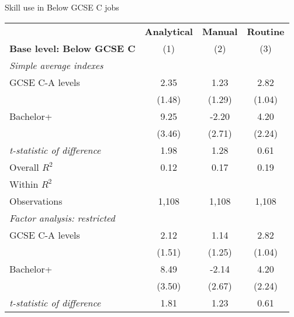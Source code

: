 \begin{center}
\begin{threeparttable}[!h]
\caption{Skill use in Below GCSE C jobs}
\label{tab:skillRegs}
\begin{tabular}{lccc}
\toprule
\toprule
&\multicolumn{1}{c}{\textbf{Analytical}}&\multicolumn{1}{c}{\textbf{Manual}}&\multicolumn{1}{c}{\textbf{Routine}} \\
\textbf{Base level: Below GCSE C}&\multicolumn{1}{c}{(1)}&\multicolumn{1}{c}{(2)}&\multicolumn{1}{c}{(3)} \\
\midrule
\textit{Simple average indexes}\vspace{1mm} \\ 
\hspace{3mm}GCSE C-A levels&        2.35         &        1.23         &        2.82\sym{**} \\
                    &      (1.48)         &      (1.29)         &      (1.04)         \\
\hspace{3mm}Bachelor+&        9.25\sym{**} &       -2.20         &        4.20         \\
                    &      (3.46)         &      (2.71)         &      (2.24)         \\
\textit{t-statistic of difference}&        1.98         &        1.28         &        0.61         \\
\midrule Overall $ R^2$&        0.12         &        0.17         &        0.19         \\
Within $ R^2$       &                     &                     &                     \\
Observations        &       1,108         &       1,108         &       1,108         \\
\midrule \vspace{1mm}\textit{Factor analysis: restricted} \\ 
\hspace{3mm}GCSE C-A levels&        2.12         &        1.14         &        2.82\sym{**} \\
                    &      (1.51)         &      (1.25)         &      (1.04)         \\
\hspace{3mm}Bachelor+&        8.49\sym{*}  &       -2.14         &        4.20         \\
                    &      (3.50)         &      (2.67)         &      (2.24)         \\
\textit{t-statistic of difference}&        1.81         &        1.23         &        0.61         \\

\end{tabular}
\end{threeparttable}
\end{center}
